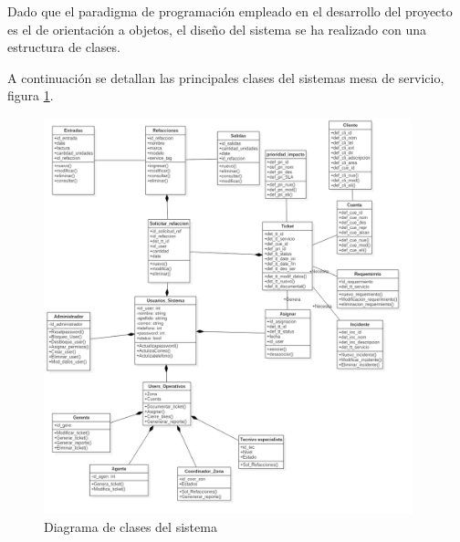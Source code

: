 Dado que el paradigma de programación empleado en el desarrollo del proyecto es el de 
orientación a objetos, el diseño del sistema se ha realizado con una estructura de clases. 

A continuación se detallan las principales clases del sistemas mesa de servicio, figura \ref{fig:jbgsjkhdgb}. 
\begin{figure}[H]
	\centering
	\includegraphics[width=0.95\textwidth]{Capitulo4/Diagramas/Completo}
	\caption{Diagrama de clases del sistema}
	\label{fig:jbgsjkhdgb}
\end{figure}


